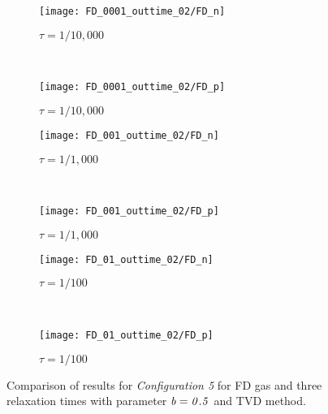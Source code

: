\documentclass[twoside,twocolumn,prc,floats,amsmath,amssymb]{revtex4} %
\begin{document}
\begin{figure}
        \centering
        \begin{subfigure}[b]{0.23\textwidth}
                \centering
                \texttt{[image: FD\_0001\_outtime\_02/FD\_n]}
                \caption{$\tau = 1/10,000$}
                \label{fig:5ESBGK_FD_n_tau0001}
        \end{subfigure}%
				~ %
        \begin{subfigure}[b]{0.23\textwidth}
                \centering
                \texttt{[image: FD\_0001\_outtime\_02/FD\_p]}
                \caption{$\tau = 1/10,000$}
                \label{fig:5ESBGK_FD_p_tau0001}
        \end{subfigure}
				
        \begin{subfigure}[b]{0.23\textwidth}
								\centering
                \texttt{[image: FD\_001\_outtime\_02/FD\_n]}
                \caption{$\tau = 1/1,000$}
                \label{fig:5ESBGK_FD_n_tau001}
                
        \end{subfigure}
				~ %
        \begin{subfigure}[b]{0.23\textwidth}
								\centering
                \texttt{[image: FD\_001\_outtime\_02/FD\_p]}
                \caption{$\tau = 1/1,000$}
                \label{fig:5ESBGK_FD_p_tau001}
        \end{subfigure}
				
				\begin{subfigure}[b]{0.23\textwidth}
								\centering
                \texttt{[image: FD\_01\_outtime\_02/FD\_n]}
                \caption{$\tau = 1/100$}
                \label{fig:5ESBGK_FD_n_tau01}
        \end{subfigure}
				~ %
        \begin{subfigure}[b]{0.23\textwidth}
                \centering
                \texttt{[image: FD\_01\_outtime\_02/FD\_p]}
                \caption{$\tau = 1/100$}
                \label{fig:5ESBGK_FD_p_tau01}
        \end{subfigure}
        \caption{Comparison of results for \emph{Configuration 5} for FD gas and three relaxation times with parameter $\it{b=0.5}$ and TVD method.}
				\label{fig:FD_config5_tau_comparison2}
\end{figure}
\end{document}
